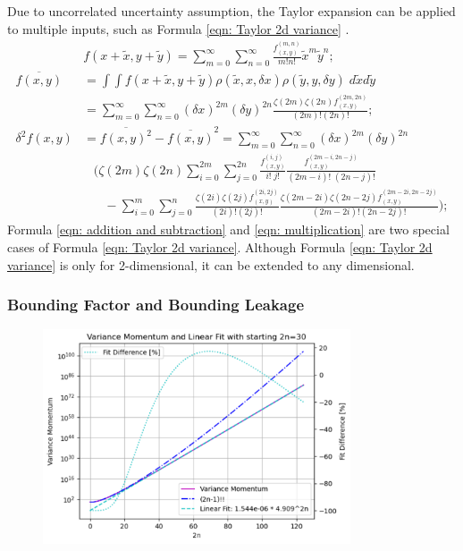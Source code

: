 \documentclass[twoside]{article}
\numberwithin{equation}{section}
\newcommand{\eqspace}{\;\;\;}
\begin{document}
Due to uncorrelated uncertainty assumption, the Taylor expansion can be applied to multiple inputs, such as Formula \eqref{eqn: Taylor 2d variance} \cite{Prev_Precision_Arithmetic} .
\begin{align}
\label{eqn: Taylor 2d}
&f(x + \tilde{x}, y + \tilde{y}) = \sum_{m=0}^{\infty} \sum_{n=0}^{\infty} \frac{f^{(m,n)}_{(x,y)}}{m! n!} \tilde{x}^m \tilde{y}^n; \\
\label{eqn: Taylor 2d mean}
\overline{f(x,y)} &= \int \int f(x + \tilde{x}, y + \tilde{y}) \rho(\tilde{x}, x, \delta x) \rho(\tilde{y}, y, \delta y)\; d \tilde{x} d \tilde{y} \\
&= \sum_{m=0}^{\infty} \sum_{n=0}^{\infty} (\delta x)^{2m} (\delta y)^{2n}  \frac{\zeta(2m) \zeta(2n) f^{(2m,2n)}_{(x,y)}}{(2m)! (2n)!}; \nonumber \\
\label{eqn: Taylor 2d variance}
\delta^2 f(x, y) &= \overline{f(x, y)^2} - \overline{f(x, y)}^2 = \sum_{m=0}^{\infty} \sum_{n=0}^{\infty} (\delta x)^{2m} (\delta y)^{2n} \\
&\eqspace (\zeta(2m) \zeta(2n) \sum_{i=0}^{2m} \sum_{j=0}^{2n} \frac{f^{(i,j)}_{(x,y)}}{i!\;j!}\frac{f^{(2m-i,2n-j)}_{(x,y)}}{(2m-i)!\;(2n-j)!} \nonumber \\
&\eqspace\eqspace - \sum_{i=0}^{m} \sum_{j=0}^{n} \frac{\zeta(2i) \zeta(2j) f^{(2i,2j)}_{(x,y)}}{(2i)!(2j)!}
	\frac{\zeta(2m-2i) \zeta(2n-2j) f^{(2m-2i,2n-2j)}_{(x,y)}}{(2m-2i)!(2n-2j)!}); \nonumber
\end{align}
Formula \eqref{eqn: addition and subtraction} and \eqref{eqn: multiplication} are two special cases of Formula \eqref{eqn: Taylor 2d variance}.
Although Formula \eqref{eqn: Taylor 2d variance} is only for 2-dimensional, it can be extended to any dimensional.



\subsubsection{Bounding Factor and Bounding Leakage}

\begin{figure}
\centering
\includegraphics[height=2.5in]{Variance_Momentum.pdf}
\label{fig: Variance_Momentum}
\end{figure}
\end{document}
